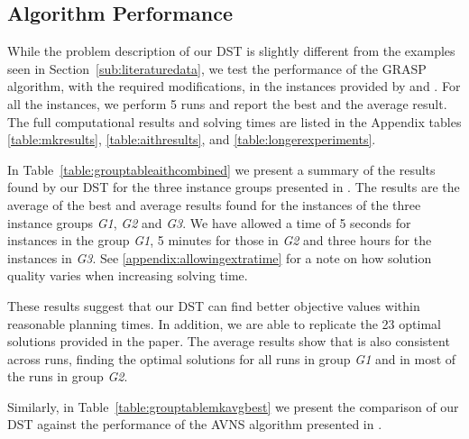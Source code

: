 \documentclass[a4paper,11pt,authoryear]{elsarticle}
\begin{document}
\subsection{Algorithm Performance}
\label{sub:algorithmperformance}
\noindent While the problem description of our DST is slightly different from the examples seen in Section~\ref{sub:literaturedata}, we test the performance of the GRASP algorithm, with the required modifications, in the instances provided by \cite{aithaddadene2016} and \cite{mankowska2014}. For all the instances, we perform 5 runs and report the best and the average result. The full computational results and solving times are listed in the Appendix tables \ref{table:mkresults}, \ref{table:aithresults}, and \ref{table:longerexperiments}. 

In Table~\ref{table:grouptableaithcombined} we present a summary of the results found by our DST for the three instance groups presented in \cite{aithaddadene2016}. The results are the average of the best and average results found for the instances of the three instance groups \emph{G1}, \emph{G2} and \emph{G3}. We have allowed a time of 5 seconds for instances in the group \emph{G1}, 5 minutes for those in \emph{G2} and three hours for the instances in \emph{G3}. See \ref{appendix:allowingextratime} for a note on how solution quality varies when increasing solving time.



\noindent These results suggest that our DST can find better objective values within reasonable planning times. In addition, we are able to replicate the 23 optimal solutions provided in the paper. The average results show that  is also consistent across runs, finding the optimal solutions for all runs in group \emph{G1} and in most of the runs in group \emph{G2}.

Similarly, in Table~\ref{table:grouptablemkavgbest} we present the comparison of our DST against the performance of the AVNS algorithm presented in \citet{mankowska2014}.
\end{document}
